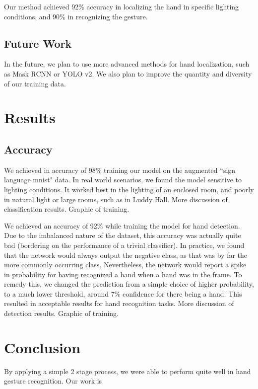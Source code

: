 \documentclass[10pt,twocolumn,letterpaper]{article}
\begin{document}
Our method achieved 92\% accuracy in localizing the hand in specific lighting conditions, and 90\% in recognizing the gesture.

\subsection{Future Work}

In the future, we plan to use more advanced methods for hand localization, such as Mask RCNN or YOLO v2. We also plan to improve the quantity and diversity of our training data.


\section{Results}

\subsection{Accuracy}

We achieved in accuracy of 98\% training our model on the augmented ``sign language mnist" data. In real world scenarios, we found the model sensitive to lighting conditions. It worked best in the lighting of an enclosed room, and poorly in natural light or large rooms, such as in Luddy Hall. More discussion of classification results. Graphic of training.

We achieved an accuracy of 92\% while training the model for hand detection. Due to the imbalanced nature of the dataset, this accuracy was actually quite bad (bordering on the performance of a trivial classifier). In practice, we found that the network would always output the negative class, as that was by far the more commonly occurring class. Nevertheless, the network would report a spike in probability for having recognized a hand when a hand was in the frame. To remedy this, we changed the prediction from a simple choice of higher probability, to a much lower threshold, around 7\% confidence for there being a hand. This resulted in acceptable results for hand recognition tasks. More discussion of detection results. Graphic of training.

\section{Conclusion}

By applying a simple 2 stage process, we were able to perform quite well in hand gesture recognition. Our work is 

{\small


}
\end{document}

